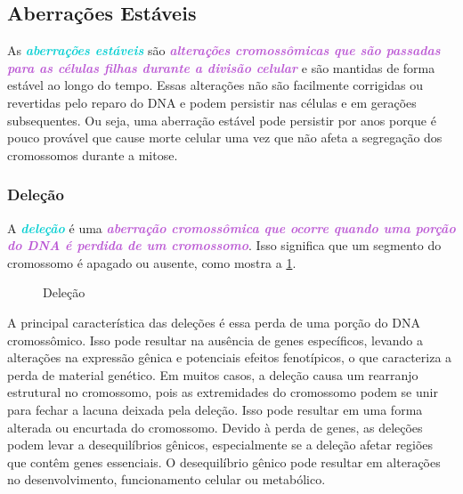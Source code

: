 \documentclass[11pt,a4paper]{article}
\begin{document}
\subsection*{Aberrações Estáveis}

	As \textcolor{DarkTurquoise}{\textbf{\textit{aberrações estáveis}}} são \textcolor{MediumOrchid}{\textbf{\textit{alterações cromossômicas que são passadas para as células filhas durante a divisão celular}}} e são mantidas de forma estável ao longo do tempo. Essas alterações não são facilmente corrigidas ou revertidas pelo reparo do DNA e podem persistir nas células e em gerações subsequentes. Ou seja, uma aberração estável pode persistir por anos porque é pouco provável que cause morte celular uma vez que não afeta a segregação dos cromossomos durante a mitose.

\subsubsection*{Deleção}

	A \textcolor{DarkTurquoise}{\textbf{\textit{deleção}}} é uma \textcolor{MediumOrchid}{\textbf{\textit{aberração cromossômica que ocorre quando uma porção do DNA é perdida de um cromossomo}}}. Isso significa que um segmento do cromossomo é apagado ou ausente, como mostra a \ref{fig:delecao}.
	
	\begin{figure}
		\caption{Deleção}
		\label{fig:delecao}
	\end{figure}
	
	A principal característica das deleções é essa perda de uma porção do DNA cromossômico. Isso pode resultar na ausência de genes específicos, levando a alterações na expressão gênica e potenciais efeitos fenotípicos, o que caracteriza a perda de material genético. Em muitos casos, a deleção causa um rearranjo estrutural no cromossomo, pois as extremidades do cromossomo podem se unir para fechar a lacuna deixada pela deleção. Isso pode resultar em uma forma alterada ou encurtada do cromossomo. Devido à perda de genes, as deleções podem levar a desequilíbrios gênicos, especialmente se a deleção afetar regiões que contêm genes essenciais. O desequilíbrio gênico pode resultar em alterações no desenvolvimento, funcionamento celular ou metabólico.
\end{document}

